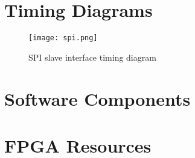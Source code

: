 \documentclass{ug}
\theoremstyle{plain}
\begin{document}
\section{Timing Diagrams}

\begin{figure}[H]
  \begin{center}
    \texttt{[image: spi.png]}
    \caption{SPI slave interface timing diagram}
    \label{fig:spi}
  \end{center}
\end{figure}

\section{Software Components}

\section*{FPGA Resources}



%
%
\end{document}
